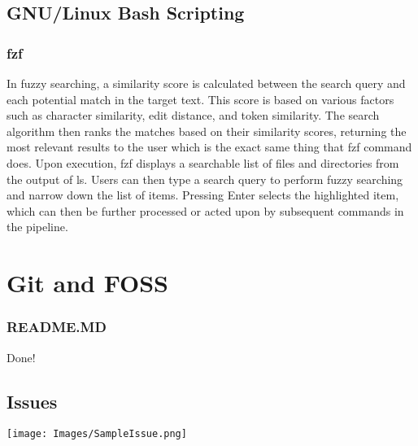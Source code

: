 \documentclass[12pt, letterpaper]{article}
\begin{document}
\subsection{GNU/Linux Bash Scripting}
\subsubsection{fzf}
In fuzzy searching, a similarity score is calculated between the search query and each potential match in the target text. This score is based on various factors such as character similarity, edit distance, and token similarity. The search algorithm then ranks the matches based on their similarity scores, returning the most relevant results to the user which is the exact same thing that fzf command does.
Upon execution, fzf displays a searchable list of files and directories from the output of ls. Users can then type a search query to perform fuzzy searching and narrow down the list of items. Pressing Enter selects the highlighted item, which can then be further processed or acted upon by subsequent commands in the pipeline.



\section{Git and FOSS}

\subsubsection{README.MD}
Done!
\subsection{Issues}

\texttt{[image: Images/SampleIssue.png]}
\end{document}
